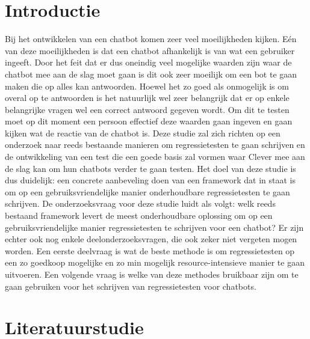 
\section{Introductie} %
\label{sec:introductie}

Bij het ontwikkelen van een chatbot komen zeer veel moeilijkheden kijken. Eén van deze moeilijkheden is dat een chatbot afhankelijk is van wat een gebruiker ingeeft. Door het feit dat er dus oneindig veel mogelijke waarden zijn waar de chatbot mee aan de slag moet gaan is dit ook zeer moeilijk om een bot te gaan maken die op alles kan antwoorden. Hoewel het zo goed als onmogelijk is om overal op te antwoorden is het natuurlijk wel zeer belangrijk dat er op enkele belangrijke vragen wel een correct antwoord gegeven wordt. Om dit te testen moet op dit moment een persoon effectief deze waarden gaan ingeven en gaan kijken wat de reactie van de chatbot is. Deze studie zal zich richten op een onderzoek naar reeds bestaande manieren om regressietesten te gaan schrijven en de ontwikkeling van een test die een goede basis zal vormen waar Clever mee aan de slag kan om hun chatbots verder te gaan testen. Het doel van deze studie is dus duidelijk: een concrete aanbeveling doen van een framework dat in staat is om op een gebruiksvriendelijke manier onderhoudbare regressietesten te gaan schrijven. De onderzoeksvraag voor deze studie luidt als volgt: welk reeds bestaand framework levert de meest onderhoudbare oplossing om op een gebruiksvriendelijke manier regressietesten te schrijven voor een chatbot? Er zijn echter ook nog enkele deelonderzoeksvragen, die ook zeker niet vergeten mogen worden. Een eerste deelvraag is wat de beste methode is om regressietesten op een zo goedkoop mogelijke en zo min mogelijk resource-intensieve manier te gaan uitvoeren. Een volgende vraag is welke van deze methodes bruikbaar zijn om te gaan gebruiken voor het schrijven van regressietesten voor chatbots. 


\section{Literatuurstudie}
\label{sec:literatuurstudie}


